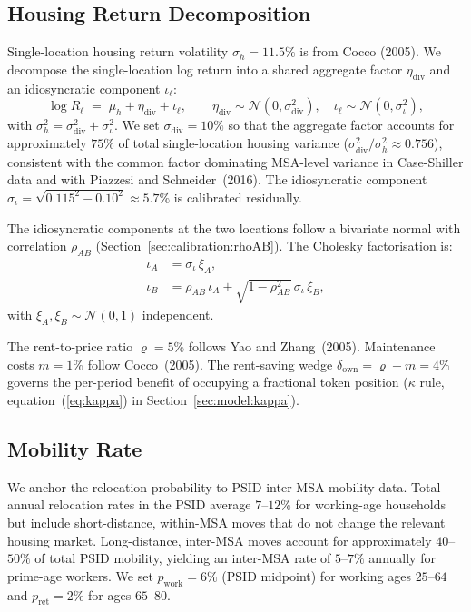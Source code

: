 \subsection{Housing Return Decomposition}
\label{sec:calibration:housing}

Single-location housing return volatility $\sigma_h = 11.5\%$ is from
Cocco (2005).
We decompose the single-location log return into a shared aggregate factor
$\eta_{\text{div}}$ and an idiosyncratic component $\iota_\ell$:
\begin{equation}
    \log R_\ell \;=\; \mu_h + \eta_{\text{div}} + \iota_\ell,
    \qquad
    \eta_{\text{div}} \sim \mathcal{N}(0,\sigma_{\text{div}}^2),
    \quad
    \iota_\ell \sim \mathcal{N}(0,\sigma_\iota^2),
    \label{eq:return_decomp}
\end{equation}
with $\sigma_h^2 = \sigma_{\text{div}}^2 + \sigma_\iota^2$.
We set $\sigma_{\text{div}} = 10\%$ so that the aggregate factor accounts
for approximately $75\%$ of total single-location housing variance
($\sigma_{\text{div}}^2 / \sigma_h^2 \approx 0.756$), consistent with
the common factor dominating MSA-level variance in Case-Shiller data
and with Piazzesi and Schneider~(2016).
The idiosyncratic component $\sigma_\iota = \sqrt{0.115^2 - 0.10^2} \approx 5.7\%$
is calibrated residually.

The idiosyncratic components at the two locations follow a bivariate normal
with correlation $\rho_{AB}$ (Section~\ref{sec:calibration:rhoAB}).
The Cholesky factorisation is:
\begin{align}
    \iota_A &= \sigma_\iota\,\xi_A, \label{eq:chol_A} \\
    \iota_B &= \rho_{AB}\,\iota_A + \sqrt{1 - \rho_{AB}^2}\,\sigma_\iota\,\xi_B,
    \label{eq:chol_B}
\end{align}
with $\xi_A, \xi_B \sim \mathcal{N}(0,1)$ independent.

The rent-to-price ratio $\varrho = 5\%$ follows Yao and Zhang~(2005).
Maintenance costs $m = 1\%$ follow Cocco~(2005).
The rent-saving wedge $\delta_{\text{own}} = \varrho - m = 4\%$ governs
the per-period benefit of occupying a fractional token position
($\kappa$ rule, equation~(\ref{eq:kappa}) in Section~\ref{sec:model:kappa}).

\subsection{Mobility Rate}
\label{sec:calibration:mobility}

We anchor the relocation probability to PSID inter-MSA mobility data.
Total annual relocation rates in the PSID average $7$--$12\%$ for
working-age households but include short-distance, within-MSA moves that
do not change the relevant housing market.
Long-distance, inter-MSA moves account for approximately $40$--$50\%$
of total PSID mobility, yielding an inter-MSA rate of $5$--$7\%$ annually
for prime-age workers.
We set $p_{\text{work}} = 6\%$ (PSID midpoint) for working ages
$25$--$64$ and $p_{\text{ret}} = 2\%$ for ages $65$--$80$.


